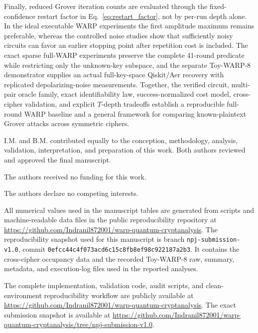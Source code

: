 \documentclass[pdflatex,sn-nature]{sn-jnl}
\theoremstyle{thmstyleone}
\theoremstyle{thmstyletwo}
\begin{document}
Finally, reduced Grover iteration counts are evaluated through the fixed-confidence restart factor in Eq.~\eqref{eq:restart_factor}, not by per-run depth alone.  In the ideal executable WARP experiments the first amplitude maximum remains preferable, whereas the controlled noise studies show that sufficiently noisy circuits can favor an earlier stopping point after repetition cost is included.  The exact sparse full-WARP experiments preserve the complete 41-round predicate while restricting only the unknown-key subspace, and the separate Toy-WARP-8 demonstrator supplies an actual full-key-space Qiskit/Aer recovery with replicated depolarizing-noise measurements.  Together, the verified circuit, multi-pair oracle family, exact identifiability law, success-normalized cost model, cross-cipher validation, and explicit $T$-depth tradeoffs establish a reproducible full-round WARP baseline and a general framework for comparing known-plaintext Grover attacks across symmetric ciphers.



\backmatter

I.M. and B.M. contributed equally to the conception, methodology, analysis, validation, interpretation, and preparation of this work. Both authors reviewed and approved the final manuscript.

The authors received no funding for this work.

The authors declare no competing interests.

All numerical values used in the manuscript tables are generated from scripts and machine-readable data files in the public reproducibility repository at \url{https://github.com/Indranil872001/warp-quantum-cryptanalysis}. The reproducibility snapshot used for this manuscript is branch \texttt{npj-submission-v1.0}, commit \texttt{0efcc44c4f073acd6c15c8fb8ef98c922187a2b3}. It contains the cross-cipher occupancy data and the recorded Toy-WARP-8 raw, summary, metadata, and execution-log files used in the reported analyses.

The complete implementation, validation code, audit scripts, and clean-environment reproducibility workflow are publicly available at \url{https://github.com/Indranil872001/warp-quantum-cryptanalysis}. The exact submission snapshot is available at \url{https://github.com/Indranil872001/warp-quantum-cryptanalysis/tree/npj-submission-v1.0}.
\end{document}
